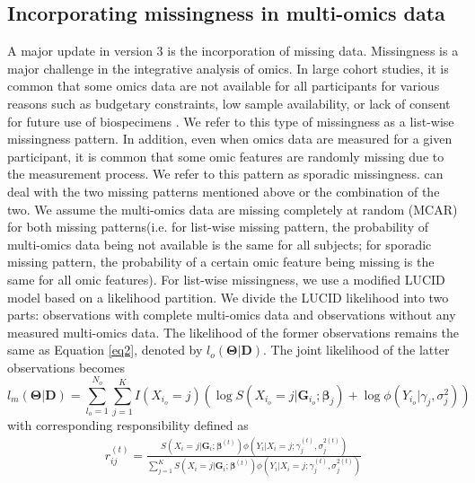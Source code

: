 \subsection{Incorporating missingness in multi-omics data}
A major update in  version 3 is the incorporation of missing data. Missingness is a major challenge in the integrative analysis of omics. In large cohort studies, it is common that some omics data are not available for all participants for various reasons such as budgetary constraints, low sample availability, or lack of consent for future use of biospecimens \citep{voillet2016handling}. We refer to this type of missingness as a list-wise missingness pattern. In addition, even when omics data are measured for a given participant, it is common that some omic features are randomly missing due to the measurement process. We refer to this pattern as sporadic missingness.  can deal with the two missing patterns mentioned above or the combination of the two. We assume the multi-omics data are missing completely at random (MCAR) for both missing patterns(i.e. for list-wise missing pattern, the probability of multi-omics data being not available is the same for all subjects; for sporadic missing pattern, the probability of a certain omic feature being missing is the same for all omic features). 
For list-wise missingness, we use a modified LUCID model based on a likelihood partition. We divide the LUCID likelihood into two parts: observations with complete multi-omics data and observations without any measured multi-omics data. The likelihood of the former observations remains the same as Equation \ref{eq2}, denoted by $l_o (\bm{\Theta}|\bm{D})$. The joint likelihood of the latter observations becomes
\begin{equation}
    l_m(\bm{\Theta}|\bm{D}) = \sum_{l_o=1}^{N_o}\sum_{j=1}^K I(X_{i_o} = j) \left( \log S(X_{i_o} = j| \bm{G}_{i_o};\bm{\beta}_j) + \log \phi\left(Y_{i_o}|\gamma_j, \sigma_j^2\right)\right)
    \label{eq22}
\end{equation}
with corresponding responsibility defined as 
\begin{equation}
    \begin{aligned}
        r_{ij}^{(t)} = \frac{S\left(X_i = j| \bm{G}_i; \bm{\beta}^{(t)}\right) \phi\left(Y_i|X_i = j; \gamma_j^{(t)}, \sigma^{2(t)}_j \right)}{\sum_{j = 1}^K S\left(X_i = j| \bm{G}_i; \bm{\beta}^{(t)}\right) \phi \left(Y_i|X_i = j; \gamma_j^{(t)}, \sigma^{2(t)}_j\right)}
    \end{aligned}
    \label{eq23}
\end{equation}

